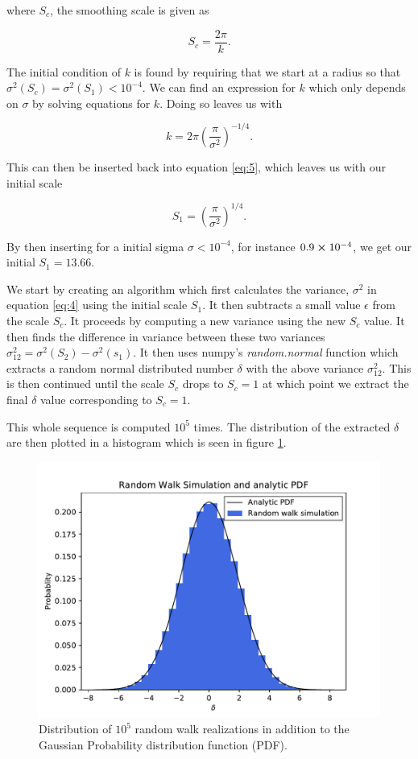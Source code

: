 \documentclass[a4paper,10pt]{article}
\begin{document}
\noindent where $S_c$, the smoothing scale is given as 

\begin{equation}\label{eq:5}
    S_c = \frac{2\pi}{k}.
\end{equation}

The initial condition of $k$ is found by requiring that we start at a radius so that $\sigma^2 (S_c) = \sigma^2 (S_1) < 10^{-4}$. We can find an expression for $k$ which only depends on $\sigma$ by solving equations for $k$. Doing so leaves us with

\begin{equation}
    k = 2\pi \left( \frac{\pi}{\sigma^2} \right)^{-1/4}.
\end{equation}

\noindent This can then be inserted back into equation \eqref{eq:5}, which leaves us with our initial scale

\begin{equation}
    S_1 = \left( \frac{\pi}{\sigma^2} \right)^{1/4}.
\end{equation}

\noindent By then inserting for a initial sigma $\sigma < 10^{-4}$, for instance $0.9 \cross 10^{-4}$, we get our initial $S_1 = 13.66$.

We start by creating an algorithm which first calculates the variance, $\sigma^2$ in equation \eqref{eq:4} using the initial scale $S_1$. It then subtracts a small value $\epsilon$ from the scale $S_c$. It proceeds by computing a new variance using the new $S_c$ value. It then finds the difference in variance between these two variances $\sigma^2_{12} = \sigma^2(S_2) - \sigma^2(s_1)$. It then uses numpy's \textit{random.normal} function which extracts a random normal distributed number $\delta$ with the above variance $\sigma^2_{12}$. This is then continued until the scale $S_c$ drops to $S_c = 1$ at which point we extract the final $\delta$ value corresponding to $S_c = 1$. 

This whole sequence is computed $10^5$ times. The distribution of the extracted $\delta$ are then plotted in a histogram  which is seen in figure \ref{fig:2}.
\begin{figure}[h]
    \centering
    \includegraphics[width=0.8\linewidth]{Figures/randomwalk.pdf}
    \caption{Distribution of $10^5$  random walk realizations in addition to the Gaussian Probability distribution function (PDF).}
    \label{fig:2}
\end{figure}
\end{document}
